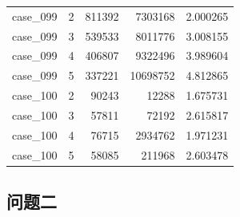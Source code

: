 \begin{longtable}{lrrrr}
case\_099 & 2 & 811392 & 7303168 & 2.000265 \\
case\_099 & 3 & 539533 & 8011776 & 3.008155 \\
case\_099 & 4 & 406807 & 9322496 & 3.989604 \\
case\_099 & 5 & 337221 & 10698752 & 4.812865 \\
case\_100 & 2 & 90243 & 12288 & 1.675731 \\
case\_100 & 3 & 57811 & 72192 & 2.615817 \\
case\_100 & 4 & 76715 & 2934762 & 1.971231 \\
case\_100 & 5 & 58085 & 211968 & 2.603478 \\
\end{longtable}
\subsection*{问题二}
